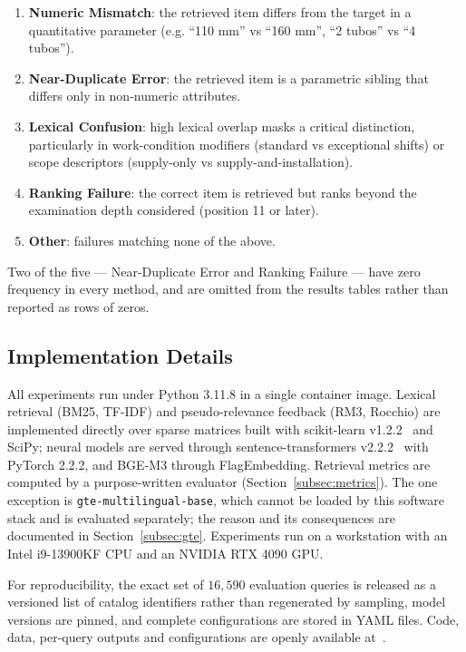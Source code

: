 \documentclass[preprint,12pt]{elsarticle}
\begin{document}
\begin{enumerate}
    \item \textbf{Numeric Mismatch}: the retrieved item differs from the target in a quantitative parameter (e.g. ``110 mm'' vs ``160 mm'', ``2 tubos'' vs ``4 tubos'').

    \item \textbf{Near-Duplicate Error}: the retrieved item is a parametric sibling that differs only in non-numeric attributes.

    \item \textbf{Lexical Confusion}: high lexical overlap masks a critical distinction, particularly in work-condition modifiers (standard vs exceptional shifts) or scope descriptors (supply-only vs supply-and-installation).

    \item \textbf{Ranking Failure}: the correct item is retrieved but ranks beyond the examination depth considered (position 11 or later).

    \item \textbf{Other}: failures matching none of the above.
\end{enumerate}

Two of the five --- Near-Duplicate Error and Ranking Failure --- have zero frequency in every method, and are omitted from the results tables rather than reported as rows of zeros.

\subsection{Implementation Details}
\label{subsec:implementation}

All experiments run under Python 3.11.8 in a single container image. Lexical retrieval (BM25, TF-IDF) and pseudo-relevance feedback (RM3, Rocchio) are implemented directly over sparse matrices built with scikit-learn v1.2.2~\citep{pedregosa2011scikit} and SciPy; neural models are served through sentence-transformers v2.2.2~\citep{reimers2019sentence} with PyTorch 2.2.2, and BGE-M3 through FlagEmbedding. Retrieval metrics are computed by a purpose-written evaluator (Section~\ref{subsec:metrics}). The one exception is \texttt{gte-multilingual-base}, which cannot be loaded by this software stack and is evaluated separately; the reason and its consequences are documented in Section~\ref{subsec:gte}. Experiments run on a workstation with an Intel i9-13900KF CPU and an NVIDIA RTX 4090 GPU.

For reproducibility, the exact set of $16{,}590$ evaluation queries is released as a versioned list of catalog identifiers rather than regenerated by sampling, model versions are pinned, and complete configurations are stored in YAML files. Code, data, per-query outputs and configurations are openly available at~\cite{bc3cat_software,bc3cat_dataset}.
\end{document}
